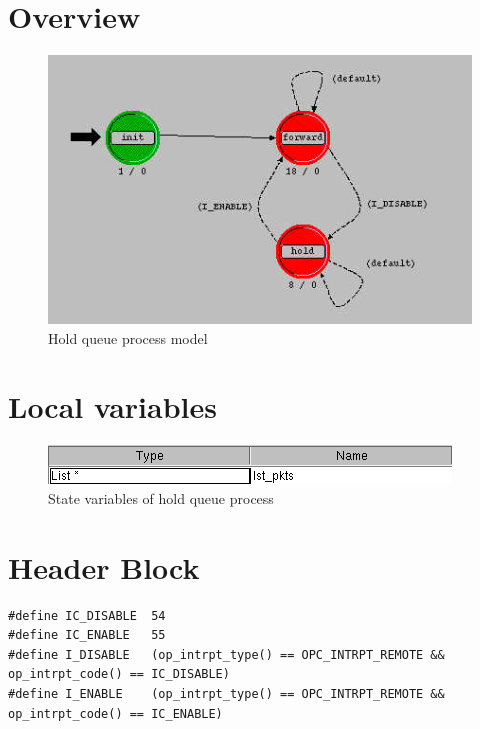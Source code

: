 

\section{Overview}
\begin{figure}[ht]
    \centering
    \includegraphics[width=.7\textwidth]{images/hold_queue}
    \caption{Hold queue process model}
    \label{fig:appendix-e}
\end{figure}

\newpage

\section{Local variables}
\begin{figure}[ht]
    \centering
    \includegraphics[width=.7\textwidth]{images/state_variable_hold_queue}
    \caption{State variables of hold queue process}
    \label{fig:appendix-e_sv}
\end{figure}

\section{Header Block}
{\tiny
\begin{verbatim}
#define IC_DISABLE	54
#define IC_ENABLE	55
#define I_DISABLE	(op_intrpt_type() == OPC_INTRPT_REMOTE && op_intrpt_code() == IC_DISABLE)
#define I_ENABLE	(op_intrpt_type() == OPC_INTRPT_REMOTE && op_intrpt_code() == IC_ENABLE)

\end{verbatim}
}

